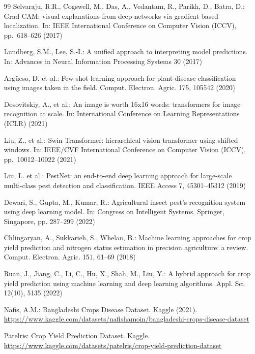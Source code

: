 \begin{thebibliography}{99}
Selvaraju, R.R., Cogswell, M., Das, A., Vedantam, R., Parikh, D.,
Batra, D.: Grad-CAM: visual explanations from deep networks via
gradient-based localization.
In: IEEE International Conference on Computer Vision (ICCV),
pp.~618--626 (2017)

Lundberg, S.M., Lee, S.-I.: A unified approach to interpreting model
predictions.
In: Advances in Neural Information Processing Systems 30 (2017)

Arg\"{u}eso, D. et al.: Few-shot learning approach for plant disease
classification using images taken in the field.
Comput. Electron. Agric. 175, 105542 (2020)

Dosovitskiy, A., et al.: An image is worth 16x16 words: transformers
for image recognition at scale.
In: International Conference on Learning Representations (ICLR) (2021)

Liu, Z., et al.: Swin Transformer: hierarchical vision transformer
using shifted windows.
In: IEEE/CVF International Conference on Computer Vision (ICCV),
pp.~10012--10022 (2021)

Liu, L. et al.: PestNet: an end-to-end deep learning approach for
large-scale multi-class pest detection and classification.
IEEE Access 7, 45301--45312 (2019)

Dewari, S., Gupta, M., Kumar, R.: Agricultural insect pest's
recognition system using deep learning model.
In: Congress on Intelligent Systems. Springer, Singapore,
pp. 287--299 (2022)

Chlingaryan, A., Sukkarieh, S., Whelan, B.: Machine learning
approaches for crop yield prediction and nitrogen status estimation
in precision agriculture: a review.
Comput. Electron. Agric. 151, 61--69 (2018)

Ruan, J., Jiang, C., Li, C., Hu, X., Shah, M., Liu, Y.: A hybrid
approach for crop yield prediction using machine learning and deep
learning algorithms. Appl. Sci. 12(10), 5135 (2022)

Nafis, A.M.: Bangladeshi Crops Disease Dataset. Kaggle (2021).
\url{https://www.kaggle.com/datasets/nafishamoin/bangladeshi-crops-disease-dataset}

Patelris: Crop Yield Prediction Dataset. Kaggle.
\url{https://www.kaggle.com/datasets/patelris/crop-yield-prediction-dataset}


\end{thebibliography}

